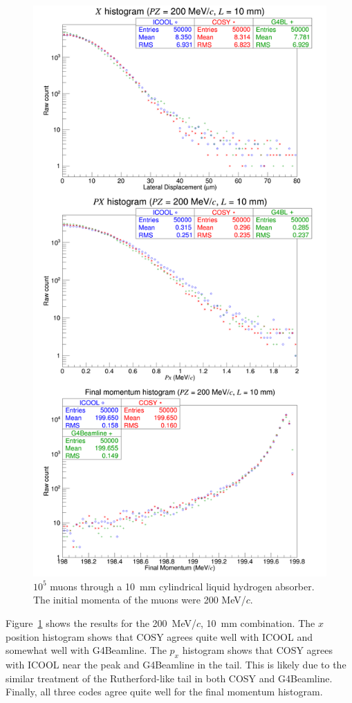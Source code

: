\documentclass[a4paper,11pt]{article}
\begin{document}
\begin{figure}[H]
  \centering
    \includegraphics[width=0.7\columnwidth]{Figures/benchmarking.200.10} 
  \caption{$10^5$ muons through a 10~mm cylindrical liquid hydrogen absorber. The initial momenta of the muons were 200 MeV/$c$.}
  \label{fig:benchmarking.100.1}
\end{figure}

Figure~\ref{fig:benchmarking.100.1} shows the results for the 200~MeV/$c$, 10~mm combination. The $x$ position histogram shows that COSY agrees quite well with ICOOL and somewhat well with G4Beamline. The $p_x$ histogram shows that COSY agrees with ICOOL near the peak and G4Beamline in the tail. This is likely due to the similar treatment of the Rutherford-like tail in both COSY and G4Beamline. Finally, all three codes agree quite well for the final momentum histogram.

\end{document}

